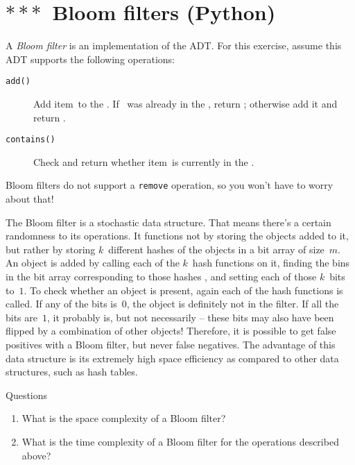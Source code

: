 \section{$\ast\ast\ast$~Bloom filters (Python)}

A \emph{Bloom filter} is an implementation of the \Set ADT. For this exercise, assume this ADT supports the following operations:
%
\begin{description}
    \item[\texttt{add(\x)}] Add item~\x to the \Set. If \x~was already in the \Set, return \false; otherwise add it and return \true.
    \item[\texttt{contains(\x)}] Check and return whether item~\x is currently in the \Set.
\end{description}
%
Bloom filters do not support a \texttt{remove} operation, so you won't have to worry about that!

The Bloom filter is a stochastic data structure. That means there's a certain randomness to its operations. It functions not by storing the objects added to it, but rather by storing $k$~different hashes of the objects in a bit array of size~$m$. An object is added by calling each of the $k$~hash functions on it, finding the bins in the bit array corresponding to those hashes , and setting each of those $k$~bits to~$1$. To check whether an object is present, again each of the hash functions is called. If any of the bits is~$0$, the object is definitely not in the filter. If all the bits are~$1$, it probably is, but not necessarily -- these bits may also have been flipped by a combination of other objects! Therefore, it is possible to get false positives with a Bloom filter, but never false negatives. The advantage of this data structure is its extremely high space efficiency as compared to other data structures, such as hash tables.
%
\begin{mybox}{Questions}
    \begin{enumerate}
        \item What is the space complexity of a Bloom filter?
        \item What is the time complexity of a Bloom filter for the operations described above?
    \end{enumerate}
\end{mybox}

